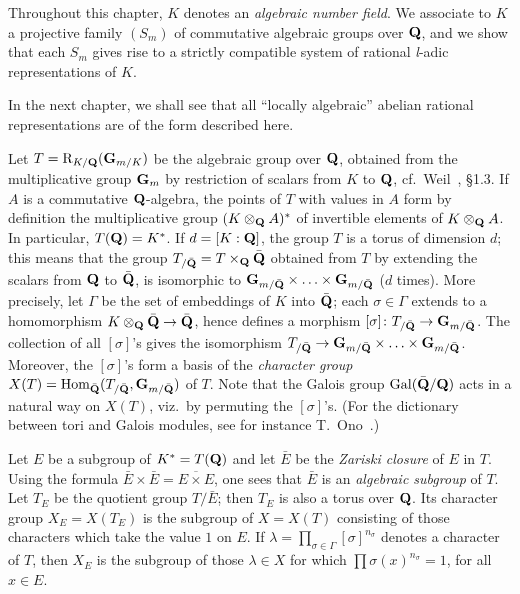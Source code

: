 

Throughout this chapter, $K$ denotes an \emph{algebraic number field}.
We associate to $K$ a projective family $(S_m)$ of commutative algebraic
groups over $\mathbf{Q}$, and we show that each $S_m$ gives rise to a strictly
compatible system of rational \textit{l}-adic representations of $K$.

In the next chapter, we shall see that all ``locally algebraic'' abelian
rational representations are of the form described here.



Let $T = \mathrm{R}_{K/\mathbf{Q}}(\mathbf{G}_{m/K})$ be the algebraic group over
$\mathbf{Q}$, obtained from the multiplicative group $\mathbf{G}_m$ by restriction of
scalars from $K$ to $\mathbf{Q}$, cf.~Weil~\cite{weil-adeles}, \S1.3.  If $A$ is a
commutative $\mathbf{Q}$-algebra, the points of $T$ with values in $A$ form by
definition the multiplicative group $(K \mathbin{\otimes}_{\mathbf{Q}} A)^*$ of invertible
elements of $K \mathbin{\otimes}_{\mathbf{Q}} A$.  In particular, $T(\mathbf{Q}) = K^*$.  If
$d = [K : \mathbf{Q}]$, the group $T$ is a torus of dimension $d$; this means that
the group $T_{/\bar{\mathbf{Q}}} = T \times_{\mathbf{Q}} \bar{\mathbf{Q}}$ obtained from $T$ by
extending the scalars from $\mathbf{Q}$ to $\bar{\mathbf{Q}}$, is isomorphic to
$\mathbf{G}_{m/\bar{\mathbf{Q}}} \times \ldots \times \mathbf{G}_{m/\bar{\mathbf{Q}}}$
($d$ times).  More precisely, let $\Gamma$ be the set of embeddings of $K$
into $\bar{\mathbf{Q}}$; each $\sigma \in \Gamma$ extends to a homomorphism
$K \mathbin{\otimes}_{\mathbf{Q}} \bar{\mathbf{Q}} \to \bar{\mathbf{Q}}$, hence defines a morphism
$[\sigma]\colon T_{/\bar{\mathbf{Q}}} \to \mathbf{G}_{m/\bar{\mathbf{Q}}}$.  The
collection of all $[\sigma]$'s gives the isomorphism
$T_{/\bar{\mathbf{Q}}} \to \mathbf{G}_{m/\bar{\mathbf{Q}}} \times \ldots \times
\mathbf{G}_{m/\bar{\mathbf{Q}}}$.  Moreover, the $[\sigma]$'s form a basis of the
\emph{character group} $X(T) = \mathrm{Hom}_{\bar{\mathbf{Q}}}(T_{/\bar{\mathbf{Q}}},
\mathbf{G}_{m/\bar{\mathbf{Q}}})$ of $T$.  Note that the Galois group
$\mathrm{Gal}(\bar{\mathbf{Q}}/\mathbf{Q})$ acts in a natural way on $X(T)$, viz.~by permuting the
$[\sigma]$'s.  (For the dictionary between tori and Galois modules, see
for instance T.~Ono~\cite{ono-tori}.)


Let $E$ be a subgroup of $K^* = T(\mathbf{Q})$ and let $\bar{E}$ be the
\emph{Zariski closure} of $E$ in $T$.  Using the formula
$\bar{E} \times \bar{E} = \overline{E \times E}$, one sees that $\bar{E}$
is an \emph{algebraic subgroup} of $T$.  Let $T_E$ be the quotient group
$T/\bar{E}$; then $T_E$ is also a torus over $\mathbf{Q}$.  Its character group
$X_E = X(T_E)$ is the subgroup of $X = X(T)$ consisting of those
characters which take the value $1$ on $E$.  If
$\lambda = \prod\limits_{\sigma \in \Gamma} [\sigma]^{n_\sigma}$ denotes a
character of $T$, then $X_E$ is the subgroup of those $\lambda \in X$ for
which $\prod \sigma(x)^{n_\sigma} = 1$, for all $x \in E$.

